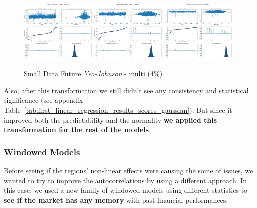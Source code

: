 \documentclass[11pt,english,a4paper,hidelinks]{book}
\begin{document}
\begin{figure}[H]
    \centering
    \includegraphics[width=0.32\textwidth]{images/code/models/linear_regression/first_model/Multi/quality_profit_1m_residuals - Gaussian.png}
    \includegraphics[width=0.32\textwidth]{images/code/models/linear_regression/first_model/Multi/quality_profit_1y_residuals - Gaussian.png}
    \includegraphics[width=0.32\textwidth]{images/code/models/linear_regression/first_model/Multi/quality_profit_5y_residuals - Gaussian.png}
    \caption{Small Data Future \textit{Yeo-Johnson} - \acrshort{multi} (4\%)}
    \label{fig:first_linear_regression_gaussian_residuals}
\end{figure}

\noindent Also, after this transformation we still didn't see any consistency and statistical significance (see appendix Table~\ref{tab:first_linear_regression_results_scores_gaussian}). But since it improved both the predictability and the normality \textbf{we applied this transformation for the rest of the models}.

\subsubsection{Windowed Models}

\noindent Before seeing if the regions' non-linear effects were causing the some of issues, we wanted to try to improve the autocorrelations by using a different approach. In this case, we used a new family of windowed models using different statistics to \textbf{see if the market has any memory} with past financial performances.
\end{document}
